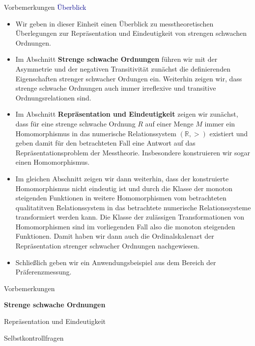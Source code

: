 \documentclass[
  8pt,
  ignorenonframetext,
]{beamer}
\begin{document}
\begin{frame}{Vorbemerkungen}
\protect\hypertarget{vorbemerkungen-4}{}
\textcolor{darkblue}{Überblick}

\footnotesize

\begin{itemize}
\item
  \justifying Wir geben in dieser Einheit einen Überblick zu
  messtheoretischen Überlegungen zur Repräsentation und Eindeutigkeit
  von strengen schwachen Ordnungen.
\item
  \justifying Im Abschnitt \textbf{Strenge schwache Ordnungen} führen
  wir mit der Asymmetrie und der negativen Transitivität zunächst die
  definierenden Eigenschaften strenger schwacher Ordungen ein. Weiterhin
  zeigen wir, dass strenge schwache Ordnungen auch immer irreflexive und
  transitive Ordnungsrelationen sind.
\item
  Im Abschnitt \textbf{Repräsentation und Eindeutigkeit} zeigen wir
  zunächst, dass für eine strenge schwache Ordnung \(R\) auf einer Menge
  \(M\) immer ein Homomorphismus in das numerische Relationssystem
  \((\mathbb{R}, >)\) existiert und geben damit für den betrachteten
  Fall eine Antwort auf das Repräsentationsproblem der Messtheorie.
  Insbesondere konstruieren wir sogar einen Homomorphismus.
\item
  Im gleichen Abschnitt zeigen wir dann weiterhin, dass der konstruierte
  Homomorphismus nicht eindeutig ist und durch die Klasse der monoton
  steigenden Funktionen in weitere Homomorphismen vom betrachteten
  qualitatitven Relationssystem in das betrachtete numerische
  Relationssysteme transformiert werden kann. Die Klasse der zulässigen
  Transformationen von Homomorphismen sind im vorliegenden Fall also die
  monoton steigenden Funktionen. Damit haben wir dann auch die
  Ordinalskalenart der Repräsentation strenger schwacher Ordnungen
  nachgewiesen.
\item
  Schließlich geben wir ein Anwendungsbeispiel aus dem Bereich der
  Präferenzmessung.
\end{itemize}
\end{frame}

\begin{frame}{}
\protect\hypertarget{section-3}{}
\Large
{}
\vfill

Vorbemerkungen

\textbf{Strenge schwache Ordnungen}

Repräsentation und Eindeutigkeit

Selbstkontrollfragen \vfill
\end{frame}
\end{document}
